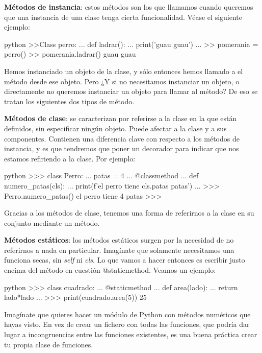 \documentclass{article}
\begin{document}
\textbf{Métodos de instancia}: estos métodos son los que llamamos cuando queremos que una instancia de una clase tenga cierta funcionalidad. Véase el siguiente ejemplo:
\begin{mintedbox}{python}
>>Class perro:
...     def ladrar():
...         print('guau guau')
...
>> pomerania = perro()
>> pomerania.ladrar()
guau guau
\end{mintedbox}

Hemos instanciado un objeto de la clase, y sólo entonces hemos llamado a el método desde ese objeto. Pero ¿Y si no necesitamos instanciar un objeto, o directamente no queremos instanciar un objeto para llamar al método? De eso se tratan los siguientes dos tipos de método.


\textbf{Métodos de clase}: se caracterizan por referirse a la clase en la que están definidos, sin especificar ningún objeto. Puede afectar a la clase y a sus componentes. Contienen una diferencia clave con respecto a los métodos de instancia, y es que tendremos que poner un decorador para indicar que nos estamos refiriendo a la clase. Por ejemplo:
\begin{mintedbox}{python}
>>> class Perro:
...     patas = 4
...     @classmethod
...     def numero_patas(cls):
...             print(f'el perro tiene {cls.patas} patas')
...
>>> Perro.numero_patas()
el perro tiene 4 patas
>>>
\end{mintedbox}
Gracias a los métodos de clase, tenemos una forma de referirnos a la clase en su conjunto mediante un método.


\textbf{Métodos estáticos}: los métodos estáticos surgen por la necesidad de no referirnos a nada en particular. Imagínate que solamente necesitamos una funciona secas, sin \textit{self} ni \textit{cls}. Lo que vamos a hacer entonces es escribir justo encima del método en cuestión @staticmethod. Veamos un ejemplo:
\begin{mintedbox}{python}
>>> class cuadrado:
...     @staticmethod
...     def area(lado):
...             return lado*lado
...
>>> print(cuadrado.area(5))
25
\end{mintedbox}
Imagínate que quieres hacer un módulo de Python con métodos numéricos que hayas visto. En vez de crear un fichero con todas las funciones, que podría dar lugar a incongruencias entre las funciones existentes, es una buena práctica crear tu propia clase de funciones.
\end{document}

